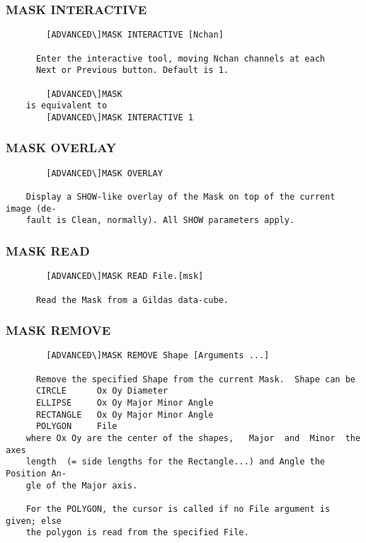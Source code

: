 \subsubsection{MASK INTERACTIVE}
\begin{verbatim}
        [ADVANCED\]MASK INTERACTIVE [Nchan]

      Enter the interactive tool, moving Nchan channels at each
      Next or Previous button. Default is 1.

        [ADVANCED\]MASK
    is equivalent to
        [ADVANCED\]MASK INTERACTIVE 1

\end{verbatim}
\subsubsection{MASK OVERLAY}
\begin{verbatim}
        [ADVANCED\]MASK OVERLAY

    Display a SHOW-like overlay of the Mask on top of the current image (de-
    fault is Clean, normally). All SHOW parameters apply.

\end{verbatim}
\subsubsection{MASK READ}
\begin{verbatim}
        [ADVANCED\]MASK READ File.[msk]

      Read the Mask from a Gildas data-cube.

\end{verbatim}
\subsubsection{MASK REMOVE}
\begin{verbatim}
        [ADVANCED\]MASK REMOVE Shape [Arguments ...]

      Remove the specified Shape from the current Mask.  Shape can be
      CIRCLE      Ox Oy Diameter
      ELLIPSE     Ox Oy Major Minor Angle
      RECTANGLE   Ox Oy Major Minor Angle
      POLYGON     File
    where Ox Oy are the center of the shapes,   Major  and  Minor  the  axes
    length  (= side lengths for the Rectangle...) and Angle the Position An-
    gle of the Major axis.

    For the POLYGON, the cursor is called if no File argument is given; else
    the polygon is read from the specified File.

\end{verbatim}
